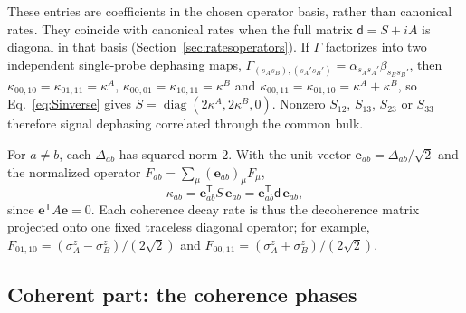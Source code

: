 \documentclass[11pt,a4paper]{article}
\newcommand{\diag}{\operatorname{diag}}
\newcommand{\dmat}{\mathsf d}
\begin{document}
These entries are coefficients in the chosen operator basis, rather
than canonical rates. They coincide with canonical rates when the full
matrix $\dmat=S+iA$ is diagonal in that basis
(Section~\ref{sec:ratesoperators}).
If $\Gamma$ factorizes into two independent single-probe dephasing
maps, $\Gamma_{(s_As_B),(s_A's_B')}=\alpha_{s_As_A'}\beta_{s_Bs_B'}$,
then $\kappa_{00,10}=\kappa_{01,11}=\kappa^A$,
$\kappa_{00,01}=\kappa_{10,11}=\kappa^B$ and
$\kappa_{00,11}=\kappa_{01,10}=\kappa^A+\kappa^B$, so
Eq.~\eqref{eq:Sinverse} gives $S=\diag(2\kappa^A,2\kappa^B,0)$. Nonzero
$S_{12}$, $S_{13}$, $S_{23}$ or $S_{33}$ therefore signal dephasing
correlated through the common bulk.

For $a\ne b$, each $\Delta_{ab}$ has squared norm $2$. With the unit vector
$\mathbf e_{ab}=\Delta_{ab}/\sqrt2$ and the normalized operator
$F_{ab}=\sum_\mu(\mathbf e_{ab})_\mu F_\mu$,
\begin{equation}
 \kappa_{ab}=\mathbf e_{ab}^{\mathsf T}S\,\mathbf e_{ab}
 =\mathbf e_{ab}^{\mathsf T}\dmat\,\mathbf e_{ab},
 \label{eq:kappaprojection}
\end{equation}
since $\mathbf e^{\mathsf T}A\mathbf e=0$. Each coherence decay rate is
thus the decoherence matrix projected onto one fixed traceless
diagonal operator; for example,
$F_{01,10}=(\sigma_A^z-\sigma_B^z)/(2\sqrt2)$ and
$F_{00,11}=(\sigma_A^z+\sigma_B^z)/(2\sqrt2)$.

\subsection{Coherent part: the coherence phases}
\label{sec:coherent}
\end{document}
